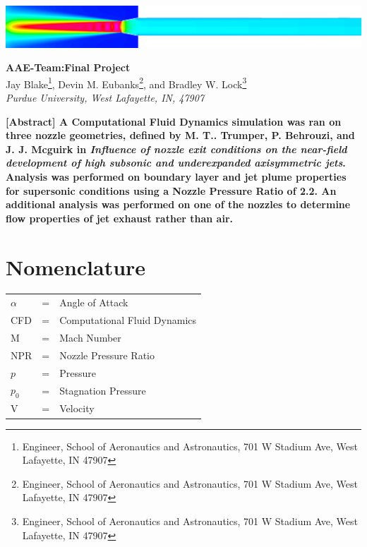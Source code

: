 \documentclass[12pt]{article} %
\title{\classnumber\:\reportnumber}
\author{Jay Blake\\Devin Eubanks\\Brad Lock\\Purdue University}
\newcommand{\classnumber}{AAE\:412\:-\:Team\:32:}
\newcommand{\reportnumber}{Final Project}
\begin{document}
\maketitle
\vspace{2in}
\begin{center}
    \includegraphics[width=\linewidth]{CoverPicture.png}
\end{center}
\clearpage
\begin{center}
{\Large\textbf{\classnumber\:\reportnumber}}\\
\vspace*{24pt}
Jay Blake\footnote{Engineer, School of Aeronautics and Astronautics, 701 W Stadium Ave, West Lafayette, IN 47907}, Devin M. Eubanks\footnote{Engineer, School of Aeronautics and Astronautics, 701 W Stadium Ave, West Lafayette, IN 47907}, and Bradley W. Lock\footnote{Engineer, School of Aeronautics and Astronautics, 701 W Stadium Ave, West Lafayette, IN 47907}\\
\textit{Purdue University, West Lafayette, IN, 47907}
\end{center}
\vspace*{48pt}
\textbf{\hspace{36pt}[Abstract] A Computational Fluid Dynamics simulation was ran on three nozzle geometries, defined by M. T.. Trumper, P. Behrouzi, and J. J. Mcguirk in \textit{Influence  of  nozzle  exit  conditions on  the  near-field  development  of  high  subsonic  and  underexpanded  axisymmetric  jets}. Analysis was performed on boundary layer and jet plume properties for supersonic conditions using a Nozzle Pressure Ratio of 2.2. An additional analysis was performed on one of the nozzles to determine flow properties of jet exhaust rather than air.}
\vspace*{36pt}
\section*{Nomenclature}
\begin{table}[ht]
    \begin{tabular}{l c l}
       $\alpha$&=&Angle of Attack\\
       CFD&=&Computational Fluid Dynamics\\
         M&=&Mach Number\\
         NPR&=&Nozzle Pressure Ratio\\
         $p$&=&Pressure\\
         $p_0$&=&Stagnation Pressure\\
         V&=&Velocity
    \end{tabular}
    \label{tab:nomenclature}
\end{table}
\end{document}
